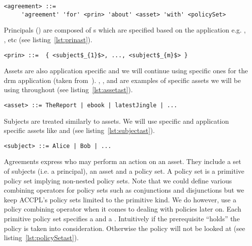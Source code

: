 \lstset{language=AST}
\begin{minipage}[c]{0.95\textwidth}
\begin{lstlisting}[frame=single, caption={agreement},label={lst:agreementast}]
<agreement> ::= 
     'agreement' 'for' <prin> 'about' <asset> 'with' <policySet> 
\end{lstlisting}
\end{minipage} 

Principals () are composed of s which are specified based on the application e.g. , , etc (see listing~\ref{lst:prinast}).

\lstset{mathescape, language=AST}  
\begin{lstlisting}[frame=single, caption={prin},label={lst:prinast}]
<prin> ::=  { <subject$_{1}$>, ..., <subject$_{m}$> }
\end{lstlisting}

Assets are also application specific and we will continue using specific ones for the \ac{drm} application (taken from~\cite{pucella2006}). , , and  are examples of specific assets we will be using throughout (see listing~\ref{lst:assetast}). 

\lstset{mathescape, language=AST}  
\begin{lstlisting}[frame=single, caption={asset},label={lst:assetast}]
<asset> ::= TheReport | ebook | latestJingle | ...
\end{lstlisting}

Subjects are treated similarly to assets. We will use specific and application specific assets like  and  (see listing~\ref{lst:subjectast}).

\lstset{mathescape, language=AST}  
\begin{lstlisting}[frame=single, caption={subject},label={lst:subjectast}]
<subject> ::= Alice | Bob | ...
\end{lstlisting}

Agreements express who may perform an action on an asset. They include a set of subjects (i.e. a principal), an asset and a policy set. A policy set is a primitive policy set implying non-nested policy sets. Note that we could define various combining operators for policy sets such as conjunctions and disjunctions but we keep \ac{ACCPL}'s policy sets limited to the primitive kind. We do however, use a policy combining operator when it comes to dealing with policies later on. Each primitive policy set specifies a  and a . Intuitively if the prerequisite ``holds'' the policy is taken into consideration. Otherwise the policy will not be looked at (see listing~\ref{lst:policySetast}).


